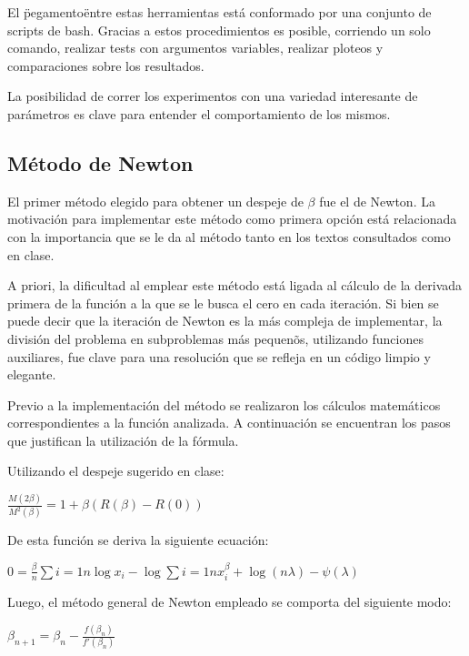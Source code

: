 El \"pegamento\" entre estas herramientas est\'a conformado por una conjunto de
scripts de bash. Gracias a estos procedimientos es posible, corriendo un solo
comando, realizar tests con argumentos variables, realizar ploteos y
comparaciones sobre los resultados.

La posibilidad de correr los experimentos con una variedad interesante de
par\'ametros es clave para entender el comportamiento de los mismos.


\subsection{M\'etodo de Newton}

El primer m\'etodo elegido para obtener un despeje de $\beta$ fue el de Newton. 
La motivaci\'on para implementar este m\'etodo como primera opci\'on est\'a 
relacionada con la importancia que se le da al m\'etodo tanto en los textos 
consultados como en clase.

A priori, la dificultad al emplear este m\'etodo est\'a ligada al c\'alculo de 
la derivada primera de la funci\'on a la que se le busca el cero en cada 
iteraci\'on. Si bien se puede decir que la iteraci\'on de Newton es la m\'as 
compleja de implementar, la divisi\'on del problema en subproblemas 
m\'as pequen\~os, utilizando funciones auxiliares, fue clave para una 
resoluci\'on que se refleja en un c\'odigo limpio y elegante.

Previo a la implementaci\'on del m\'etodo se realizaron los c\'alculos 
matem\'aticos correspondientes a la funci\'on analizada. 
A continuaci\'on se encuentran los pasos que justifican la utilizaci\'on 
de la f\'ormula.

Utilizando el despeje sugerido en clase:

\begin{center}
$\frac{M(2\beta)}{M^2(\beta)}=1 + \beta(R(\beta)-R(0))$\\
\end{center}

De esta funci\'on se deriva la siguiente ecuaci\'on: 

\begin{center}
$0 = \frac{\beta}{n}\sum{i=1}{n}\log x_i - \log \sum{i=1}{n}x_i^{\beta} 
+ \log(n\lambda)-\psi(\lambda)$\\
\end{center}

Luego, el m\'etodo general de Newton empleado se comporta del siguiente modo: 
\begin{center}

$\beta_{n+1} = \beta_{n} - \frac{f(\beta_{n})}{f'(\beta_{n})}$\\

\end{center}


